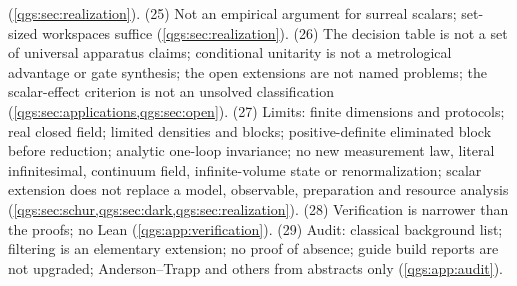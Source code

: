 \documentclass[11pt,oneside]{article}
\numberwithin{equation}{section}
\theoremstyle{plain}
\theoremstyle{definition}
\theoremstyle{remark}
\begin{document}
(\cref{qgs:sec:realization}). (25) Not an empirical argument for surreal scalars; set-sized workspaces suffice (\cref{qgs:sec:realization}). (26) The decision table is not a set of universal apparatus claims; conditional unitarity is not a metrological advantage or gate synthesis; the open extensions are not named problems; the scalar-effect criterion is not an unsolved classification (\cref{qgs:sec:applications,qgs:sec:open}). (27) Limits: finite dimensions and protocols; real closed field; limited densities and blocks; positive-definite eliminated block before reduction; analytic one-loop invariance; no new measurement law, literal infinitesimal, continuum field, infinite-volume state or renormalization; scalar extension does not replace a model, observable, preparation and resource analysis (\cref{qgs:sec:schur,qgs:sec:dark,qgs:sec:realization}). (28) Verification is narrower than the proofs; no Lean (\cref{qgs:app:verification}). (29) Audit: classical background list; filtering is an elementary extension; no proof of absence; guide build reports are not upgraded; Anderson--Trapp and others from abstracts only (\cref{qgs:app:audit}).
\end{document}
